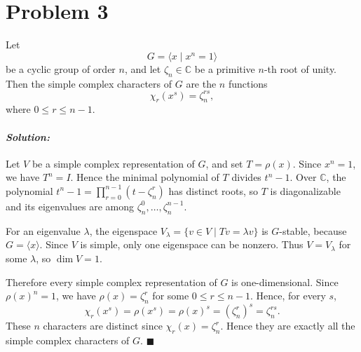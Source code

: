 \documentclass[12pt, a4paper]{article}
\theoremstyle{remark}
\newenvironment{solution}
  {\paragraph{\textit{Solution:}}\par\medskip}
  {\hfill$\blacksquare$\vspace{0.1cm}}
\begin{document}
\section*{Problem 3}

Let
\[
G=\langle x\mid x^n=1\rangle
\]
be a cyclic group of order \(n\), and let \(\zeta_n\in \mathbb{C}\) be a
primitive \(n\)-th root of unity. Then the simple complex characters of \(G\)
are the \(n\) functions
\[
\chi_r(x^s)=\zeta_n^{rs},
\]
where \(0\le r\le n-1\).
\begin{solution}
    Let \(V\) be a simple complex representation of \(G\), and set
\(T=\rho(x)\). Since \(x^n=1\), we have \(T^n=I\). Hence the minimal
polynomial of \(T\) divides \(t^n-1\). Over \(\mathbb C\), the polynomial
\(t^n-1=\prod_{r=0}^{n-1}(t-\zeta_n^r)\) has distinct roots, so \(T\) is
diagonalizable and its eigenvalues are among
\(\zeta_n^0,\dots,\zeta_n^{n-1}\).

For an eigenvalue \(\lambda\), the eigenspace
\(V_\lambda=\{v\in V\mid Tv=\lambda v\}\) is \(G\)-stable, because
\(G=\langle x\rangle\). Since \(V\) is simple, only one eigenspace can be
nonzero. Thus \(V=V_\lambda\) for some \(\lambda\), so \(\dim V=1\).

Therefore every simple complex representation of \(G\) is one-dimensional.
Since \(\rho(x)^n=1\), we have \(\rho(x)=\zeta_n^r\) for some
\(0\le r\le n-1\). Hence, for every \(s\),
\[
\chi_r(x^s)=\rho(x^s)=\rho(x)^s=(\zeta_n^r)^s=\zeta_n^{rs}.
\]
These \(n\) characters are distinct since
\(\chi_r(x)=\zeta_n^r\). Hence they are exactly all the simple complex
characters of \(G\).
\end{solution}
\end{document}
